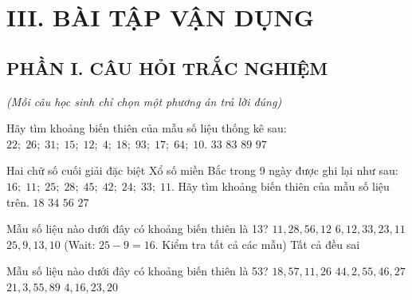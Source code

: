 \vspace{0.4cm}
\section*{III. BÀI TẬP VẬN DỤNG}

\subsection*{PHẦN I. CÂU HỎI TRẮC NGHIỆM}
\textit{\small (Mỗi câu học sinh chỉ chọn một phương án trả lời đúng)}
\setcounter{ex}{0}

\begin{ex}
	Hãy tìm khoảng biến thiên của mẫu số liệu thống kê sau: $22;\; 26;\; 31;\; 15;\; 12;\; 4;\; 18;\; 93;\; 17;\; 64;\; 10$.
	\choice
	{$33$}
	{$83$}
	{\True $89$}
	{$97$}
\end{ex}

\begin{ex}
	Hai chữ số cuối giải đặc biệt Xổ số miền Bắc trong 9 ngày được ghi lại như sau: $16;\; 11;\; 25;\; 28;\; 45;\; 42;\; 24;\; 33;\; 11$. Hãy tìm khoảng biến thiên của mẫu số liệu trên.
	\choice
	{$18$}
	{\True $34$}
	{$56$}
	{$27$}
\end{ex}

\begin{ex}
	Mẫu số liệu nào dưới đây có khoảng biến thiên là 13?
	\choice
	{$11, 28, 56, 12$}
	{$6, 12, 33, 23, 11$}
	{\True $25, 9, 13, 10$ (Wait: $25 - 9 = 16$. Kiểm tra tất cả các mẫu)}
	{Tất cả đều sai}
\end{ex}

\begin{ex}
	Mẫu số liệu nào dưới đây có khoảng biến thiên là 53?
	\choice
	{$18, 57, 11, 26$}
	{\True $44, 2, 55, 46, 27$}
	{$21, 3, 55, 89$}
	{$4, 16, 23, 20$}
\end{ex}

